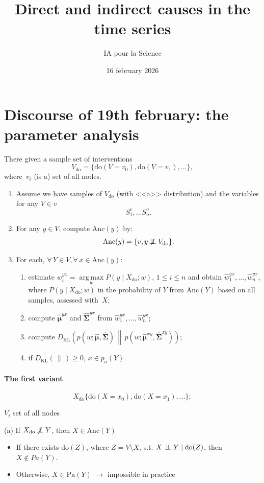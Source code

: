 \documentclass[12pt]{article}
\title{Direct and indirect causes in the time series}
\author{IA pour la Science}
\date{16 february 2026}
\newcommand\indep{\mathrel{\perp\mspace{-10mu}\perp}}
\newcommand\nindep{\mathrel{\mathrlap{\not}\mspace{-7mu}\indep}}
\newcommand{\KL}[2]{D_{\mathrm{KL}}\!\left(#1 \,\middle\|\, #2\right)}
\newcommand{\doop}{\mathrm{do}}
\newcommand{\Anc}{\mathrm{Anc}}
\newcommand{\Pa}{\mathrm{Pa}}
\newcommand{\argmax}{\operatorname*{arg\,max}\limits}
\newcommand{\bmu}{\boldsymbol{\mu}}
\newcommand{\bSig}{\boldsymbol{\Sigma}}
\begin{document}
\section{Discourse of 19th february: the parameter analysis}
There given a sample set of interventions
\[
    V_\doop = \{\doop(V = v_0), \doop(V = v_1), \dots \},
\]
where~$v_i$ (is a) set of all nodes.

\begin{enumerate}%
    \item Assume we have samples of $V_\doop$ (with <<a>> distribution) and the variables for any $V\in v$
    \[
        S_1^v,\dots S_n^v.
    \]
    \item For any $y \in V$, compute $\Anc(y)$ by:
    \[
        \Anc(y) = \{ v, y \nindep V_\doop \}.
    \]
    \item For each, $\forall\, Y \in V, \forall\, x \in \Anc(y)$:
    \begin{enumerate}%
        \item estimate $w_i^{yx} = \argmax_w P(y\mid X_\doop; w)$,
        $ 1 \leq i \leq n$ and obtain $\hat{w}_1^{yx}, \dots, \hat{w}_n^{yx}$,
        where $P(y\mid X_\doop; w)$ in the probability of $Y$ from $\Anc(Y)$ based on all samples, assessed with~$X$;
        \item compute $\hat{\bmu}^{yx}$ and  $\hat{\bSig}^{yx}$ from $\hat{w}_1^{yx}, \dots, \hat{w}_n^{yx}$;
        \item compute $\KL{p(w; \hat{\bmu}, \hat{\bSig})}{p(w; \hat{\bmu}^{xy}, \hat{\bSig}^{xy})}$;
        \item if $\KL{}{} \geq 0$, $x \in p_a(Y)$.
    \end{enumerate}
\end{enumerate}

\paragraph{The first variant}
\[
X_\doop \{ \doop (X = x_0), \doop (X=x_1), \dots \};
\]

$V_i$ set of all nodes

(a) If $X_\doop \nindep Y$, then $X \in \Anc(Y)$

\begin{itemize}
    \item If there exists $\doop(Z)$, where $Z = V\setminus X$, s.t. $X\indep Y \mid \doop(Z)$, then $X\notin Pa(Y)$.
    \item Otherwise, $X\in\Pa(Y)$ $\to$ impossible in practice
\end{itemize}
\end{document}
